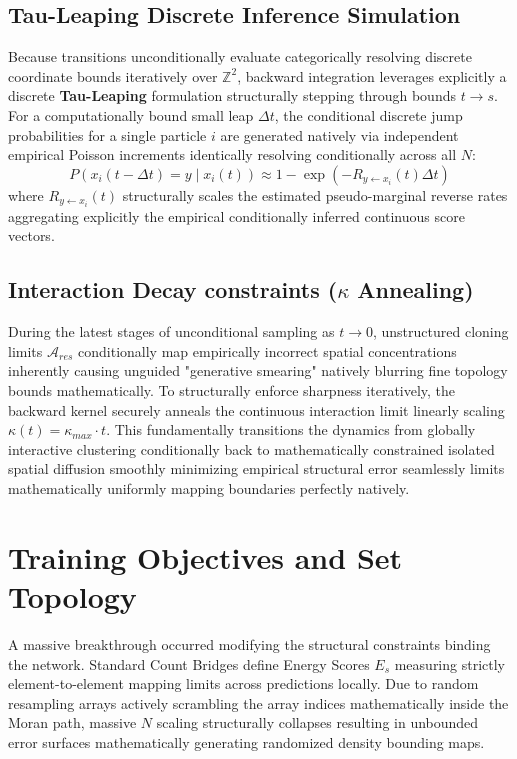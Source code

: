 \documentclass{article}
\begin{document}
\subsection{Tau-Leaping Discrete Inference Simulation}
Because transitions unconditionally evaluate categorically resolving discrete coordinate bounds iteratively over \(\mathbb{Z}^2\), backward integration leverages explicitly a discrete \textbf{Tau-Leaping} formulation structurally stepping through bounds \(t \to s\). For a computationally bound small leap \(\Delta t\), the conditional discrete jump probabilities for a single particle \(i\) are generated natively via independent empirical Poisson increments identically resolving conditionally across all \(N\):
\[
P(x_i(t - \Delta t) = y \mid x_i(t)) \approx 1 - \exp\left( - R_{y \leftarrow x_i}(t) \Delta t \right)
\]
where \(R_{y \leftarrow x_i}(t)\) structurally scales the estimated pseudo-marginal reverse rates aggregating explicitly the empirical conditionally inferred continuous score vectors.

\subsection{Interaction Decay constraints (\(\kappa\) Annealing)}
During the latest stages of unconditional sampling as \(t \to 0\), unstructured cloning limits \(\mathcal{A}_{res}\) conditionally map empirically incorrect spatial concentrations inherently causing unguided "generative smearing" natively blurring fine topology bounds mathematically. To structurally enforce sharpness iteratively, the backward kernel securely anneals the continuous interaction limit linearly scaling \(\kappa(t) = \kappa_{max} \cdot t\). This fundamentally transitions the dynamics from globally interactive clustering conditionally back to mathematically constrained isolated spatial diffusion smoothly minimizing empirical structural error seamlessly limits mathematically uniformly mapping boundaries perfectly natively.

\section{Training Objectives and Set Topology}
A massive breakthrough occurred modifying the structural constraints binding the network. Standard Count Bridges define Energy Scores $E_s$ measuring strictly element-to-element mapping limits across predictions locally. Due to random resampling arrays actively scrambling the array indices mathematically inside the Moran path, massive $N$ scaling structurally collapses resulting in unbounded error surfaces mathematically generating randomized density bounding maps.
\end{document}
